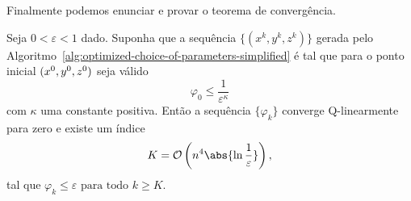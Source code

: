 







Finalmente podemos enunciar e provar o teorema de convergência. 


\begin{teo}
	\label{teo:alg-convergence-varphi} Seja $0 < \varepsilon <1$ dado. Suponha que a sequência $\{(x^{k},y^{k},z^{k})\}$ gerada pelo Algoritmo~\ref{alg:optimized-choice-of-parameters-simplified} é  tal que 
	para o ponto inicial $(x^0,y^0,z^0)$ seja válido	
	\begin{equation}
	\label{eq:varphi0-eps-kappa}
		\varphi_{0}\leq \dfrac{1}{\varepsilon^{\kappa}}
	\end{equation} 
	com  $\kappa$ uma constante positiva. Então a sequência $\{\varphi_{k}\}$ converge Q-linearmente para zero e existe um índice \[K =  \Oset\left(n^{4}\abs{\ln\frac{1}{\varepsilon}}\right),\] tal que 
	 $\varphi_{k}\leq \varepsilon \text{ para todo } k \geq K$.
	 
\end{teo}

